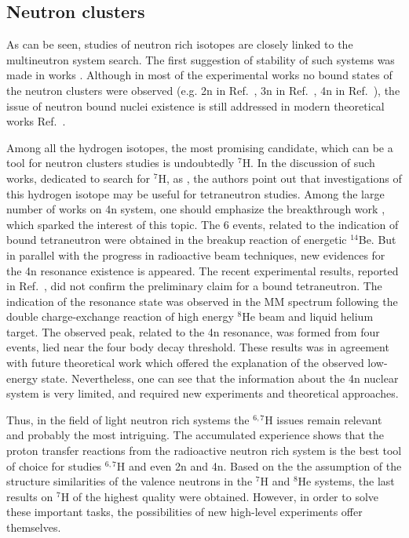 \subsection{Neutron clusters}

As can be seen, studies of neutron rich isotopes are closely linked to the multineutron system search.
The first suggestion of stability of such systems was made in works \cite{Zeldovich:1960,Goldansky:1960}.
Although in most of the experimental works no bound states of the neutron clusters were observed (e.g. 2n in Ref.\ \cite{Voitovetsky:1955}, 3n in Ref.\ \cite{belozyorov:1988}, 4n in Ref.\ \cite{Marques_PhysRev:2002,Kisamori:2016}), the issue of neutron bound nuclei existence is still addressed in modern theoretical works Ref.\ \cite{Pieper:2003,Timofeyuk:2003b,Higgins:2021}.

Among all the hydrogen isotopes, the most promising candidate, which can be a tool for neutron clusters studies is undoubtedly $^{7}$H. 
In the discussion of such works, dedicated to search for $^{7}$H, as \cite{Caamano:2008}, the authors point out that investigations of this hydrogen isotope may be useful for tetraneutron studies.  
Among the large number of works on 4n system, one should emphasize the breakthrough work \cite{Marques_PhysRev:2002}, which sparked the interest of this topic.
The 6 events, related to the indication of bound tetraneutron were obtained in the breakup reaction of energetic $^{14}$Be.
But in parallel with the progress in radioactive beam techniques, new evidences for the 4n resonance existence is appeared.
The recent experimental results, reported in Ref.\ \cite{Kisamori:2016}, did not confirm the preliminary claim for a bound tetraneutron.
The indication of the resonance state was observed in the MM spectrum following the double charge-exchange reaction of high energy $^{8}$He beam and liquid helium target. 
The observed peak, related to the 4n resonance, was formed from four events, lied near the four body decay threshold.
These results was in agreement with future theoretical work \cite{Shirokov:2016,Higgins:2021} which offered the explanation of the observed low-energy state.
Nevertheless, one can see that the information about the 4n nuclear system is very limited, and required new experiments and theoretical approaches.

Thus, in the field of light neutron rich systems the $^{6,7}$H issues remain relevant and probably the most intriguing.
The accumulated experience shows that the proton transfer reactions from the radioactive neutron rich system is the best tool of choice for studies $^{6,7}$H and even 2n and 4n.
Based on the the assumption of the structure similarities of the valence neutrons in the $^{7}$H and $^{8}$He systems, the last results on $^{7}$H of the highest quality were obtained.
However, in order to solve these important tasks, the possibilities of new high-level experiments offer themselves. 

